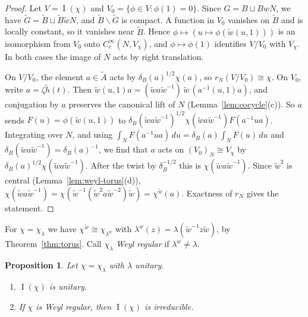 \documentclass[12pt,letterpaper]{article}
\numberwithin{equation}{section}
\theoremstyle{plain}
\newtheorem{proposition}[theorem]{Proposition}
\theoremstyle{definition}
\theoremstyle{remark}
\newcommand{\Gt}{\widetilde G}
\newcommand{\At}{\widetilde A}
\newcommand{\Bt}{\widetilde B}
\newcommand{\hl}{\tilde h}
\newcommand{\wt}{\tilde w}
\DeclareMathOperator{\PI}{I}
\begin{document}
\begin{proof}
Let $V=\PI(\chi)$ and $V_0=\{\phi\in V:\phi(1)=0\}$. Since
$G=B\sqcup BwN$, we have $\Gt=\Bt\sqcup\Bt\wt N$, and $\Bt\backslash\Gt$
is compact. A function in $V_0$ vanishes on $\Bt$ and is locally
constant, so it vanishes near $\Bt$. Hence
$\phi\mapsto(u\mapsto\phi(\wt(u,1)))$ is an isomorphism from $V_0$ onto
$C_c^\infty(N,V_\chi)$, and $\phi\mapsto\phi(1)$ identifies $V/V_0$
with $V_\chi$. In both cases the image of $N$ acts by right
translation.

On $V/V_0$, the element $a\in\At$ acts by $\delta_B(a)^{1/2}\chi(a)$,
so $r_N(V/V_0)\cong\chi$. On $V_0$, write $a=\zeta\hl(t)$. Then
$\wt(u,1)a=(\wt a\wt^{-1})\,\wt\,(a^{-1}(u,1)a)$, and conjugation by $a$
preserves the canonical lift of $N$ (Lemma~\ref{lem:cocycle}(c)). So
$a$ sends $F(u)=\phi(\wt(u,1))$ to
$\delta_B(\wt a\wt^{-1})^{1/2}\chi(\wt a\wt^{-1})F(a^{-1}ua)$. Integrating
over $N$, and using $\int_NF(a^{-1}ua)\,du=\delta_B(a)\int_NF(u)\,du$
and $\delta_B(\wt a\wt^{-1})=\delta_B(a)^{-1}$, we find that $a$ acts on
$(V_0)_N\cong V_\chi$ by $\delta_B(a)^{1/2}\chi(\wt a\wt^{-1})$. After
the twist by $\delta_B^{-1/2}$ this is $\chi(\wt a\wt^{-1})$. Since
$\wt^2$ is central (Lemma~\ref{lem:weyl-torus}(d)),
$\chi(\wt a\wt^{-1})=\chi(\wt^{-1}(\wt^2a\wt^{-2})\wt)=\chi^{\wt}(a)$.
Exactness of $r_N$ gives the statement.
\end{proof}

For $\chi=\chi_\lambda$ we have $\chi^{\wt}\cong\chi_{\lambda^w}$ with
$\lambda^w(z)=\lambda(\wt^{-1}z\wt)$, by
Theorem~\ref{thm:torus}. Call $\chi_\lambda$ \emph{Weyl regular} if
$\lambda^w\ne\lambda$.

\begin{proposition}\label{prop:tempered}
Let $\chi=\chi_\lambda$ with $\lambda$ unitary.
\begin{enumerate}[label=(\alph*)]
\item $\PI(\chi)$ is unitary.
\item If $\chi$ is Weyl regular, then $\PI(\chi)$ is irreducible.
\end{enumerate}
\end{proposition}
\end{document}
